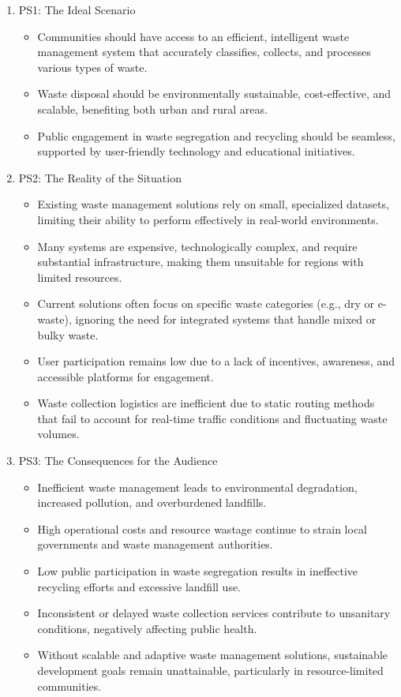 \begin{enumerate}
	\item PS1: The Ideal Scenario
	\begin{itemize}
		\item Communities should have access to an efficient, intelligent waste management system that accurately classifies, collects, and processes various types of waste.
		\item Waste disposal should be environmentally sustainable, cost-effective, and scalable, benefiting both urban and rural areas.
		\item Public engagement in waste segregation and recycling should be seamless, supported by user-friendly technology and educational initiatives.
	\end{itemize}
	
	\item PS2:  The Reality of the Situation
	\begin{itemize}
			\item Existing waste management solutions rely on small, specialized datasets, limiting their ability to perform effectively in real-world environments.
			\item Many systems are expensive, technologically complex, and require substantial infrastructure, making them unsuitable for regions with limited resources.
			\item Current solutions often focus on specific waste categories (e.g., dry or e-waste), ignoring the need for integrated systems that handle mixed or bulky waste.
			\item User participation remains low due to a lack of incentives, awareness, and accessible platforms for engagement.
			\item Waste collection logistics are inefficient due to static routing methods that fail to account for real-time traffic conditions and fluctuating waste volumes.
	\end{itemize}
	
	\item PS3:  The Consequences for the Audience		
	\begin{itemize}
			\item Inefficient waste management leads to environmental degradation, increased pollution, and overburdened landfills.
			\item High operational costs and resource wastage continue to strain local governments and waste management authorities.
			\item Low public participation in waste segregation results in ineffective recycling efforts and excessive landfill use.
			\item Inconsistent or delayed waste collection services contribute to unsanitary conditions, negatively affecting public health.
			\item Without scalable and adaptive waste management solutions, sustainable development goals remain unattainable, particularly in resource-limited communities.
	\end{itemize}

\end{enumerate}

